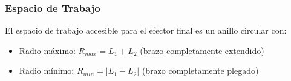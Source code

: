 






\subsubsection{Espacio de Trabajo}

El espacio de trabajo accesible para el efector final es un anillo circular con:

\begin{itemize}
    \item Radio máximo: $R_{max} = L_1 + L_2$ (brazo completamente extendido)
    \item Radio mínimo: $R_{min} = |L_1 - L_2|$ (brazo completamente plegado)
\end{itemize}





